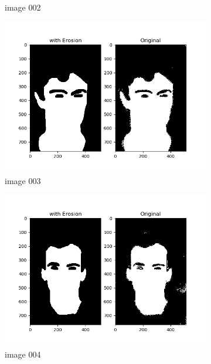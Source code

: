 \documentclass[11pt]{report}
\begin{document}
\begin{figure}[H]
\begin{subfigure}{0.4\textwidth}
        \caption{image 002}
        \label{fig:binmask_erode2}
    \end{subfigure}
    \begin{subfigure}{0.4\textwidth}
        \centering
        \includegraphics[width=\textwidth]{Task 2 Plots/bin_mask_erode_003.png}
        \caption{image 003}
        \label{fig:binmask_erode3}
    \end{subfigure}
    \begin{subfigure}{0.4\textwidth}
        \centering
        \includegraphics[width=\textwidth]{Task 2 Plots/bin_mask_erode_004.png}
        \caption{image 004}
        \label{fig:binmask_erode4}
    \end{subfigure}
    \begin{subfigure}{0.3\textwidth}

\end{subfigure}
\end{figure}
\end{document}
